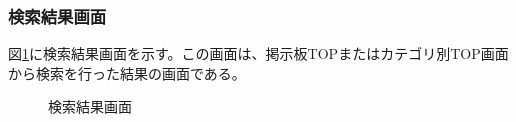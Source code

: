 \documentclass[a4j]{jarticle}
\begin{document}
\subsubsection{検索結果画面}
図\ref{fig:search_result}に検索結果画面を示す。この画面は、掲示板TOPまたはカテゴリ別TOP画面から検索を行った結果の画面である。
\begin{figure}[H]
\centering
{}
\caption{検索結果画面}
\label{fig:search_result}
\end{figure}
\end{document}
